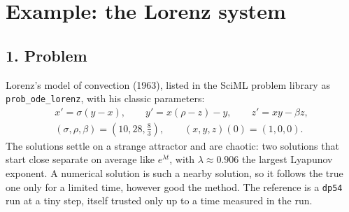 \documentclass[11pt,a4paper]{article}
\begin{document}
\section*{Example: the Lorenz system}

\subsection*{1. Problem}
Lorenz's model of convection (1963), listed in the SciML problem library as
\texttt{prob\_ode\_lorenz}, with his classic parameters:
\begin{gather*}
  x' = \sigma (y - x), \qquad y' = x(\rho - z) - y, \qquad z' = xy - \beta z,\\
  (\sigma, \rho, \beta) = (10, 28, \tfrac83), \qquad (x, y, z)(0) = (1, 0, 0).
\end{gather*}
The solutions settle on a strange attractor and are chaotic: two solutions
that start close separate on average like $e^{\lambda t}$, with
$\lambda \approx 0.906$ the largest Lyapunov exponent. A numerical solution
is such a nearby solution, so it follows the true one only for a limited
time, however good the method. The reference is a \texttt{dp54} run at a tiny
step, itself trusted only up to a time measured in the run.
\begin{center}
\small

\end{center}

\newpage
\end{document}
